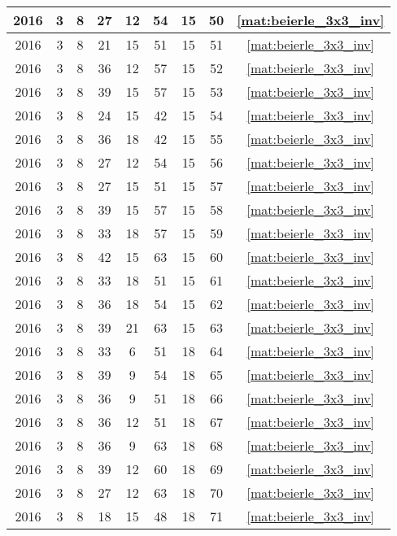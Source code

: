 \begin{longtable}{|c|c|c|c|c|c|c|c|c|}
2016 & 3 & 8 & 27 & 12 & 54 & 15 & 50 & \eqref{mat:beierle_3x3_inv} \\ \hline 
2016 & 3 & 8 & 21 & 15 & 51 & 15 & 51 & \eqref{mat:beierle_3x3_inv} \\ \hline 
2016 & 3 & 8 & 36 & 12 & 57 & 15 & 52 & \eqref{mat:beierle_3x3_inv} \\ \hline 
2016 & 3 & 8 & 39 & 15 & 57 & 15 & 53 & \eqref{mat:beierle_3x3_inv} \\ \hline 
2016 & 3 & 8 & 24 & 15 & 42 & 15 & 54 & \eqref{mat:beierle_3x3_inv} \\ \hline 
2016 & 3 & 8 & 36 & 18 & 42 & 15 & 55 & \eqref{mat:beierle_3x3_inv} \\ \hline 
2016 & 3 & 8 & 27 & 12 & 54 & 15 & 56 & \eqref{mat:beierle_3x3_inv} \\ \hline 
2016 & 3 & 8 & 27 & 15 & 51 & 15 & 57 & \eqref{mat:beierle_3x3_inv} \\ \hline 
2016 & 3 & 8 & 39 & 15 & 57 & 15 & 58 & \eqref{mat:beierle_3x3_inv} \\ \hline 
2016 & 3 & 8 & 33 & 18 & 57 & 15 & 59 & \eqref{mat:beierle_3x3_inv} \\ \hline 
2016 & 3 & 8 & 42 & 15 & 63 & 15 & 60 & \eqref{mat:beierle_3x3_inv} \\ \hline 
2016 & 3 & 8 & 33 & 18 & 51 & 15 & 61 & \eqref{mat:beierle_3x3_inv} \\ \hline 
2016 & 3 & 8 & 36 & 18 & 54 & 15 & 62 & \eqref{mat:beierle_3x3_inv} \\ \hline 
2016 & 3 & 8 & 39 & 21 & 63 & 15 & 63 & \eqref{mat:beierle_3x3_inv} \\ \hline 
2016 & 3 & 8 & 33 & 6 & 51 & 18 & 64 & \eqref{mat:beierle_3x3_inv} \\ \hline 
2016 & 3 & 8 & 39 & 9 & 54 & 18 & 65 & \eqref{mat:beierle_3x3_inv} \\ \hline 
2016 & 3 & 8 & 36 & 9 & 51 & 18 & 66 & \eqref{mat:beierle_3x3_inv} \\ \hline 
2016 & 3 & 8 & 36 & 12 & 51 & 18 & 67 & \eqref{mat:beierle_3x3_inv} \\ \hline 
2016 & 3 & 8 & 36 & 9 & 63 & 18 & 68 & \eqref{mat:beierle_3x3_inv} \\ \hline 
2016 & 3 & 8 & 39 & 12 & 60 & 18 & 69 & \eqref{mat:beierle_3x3_inv} \\ \hline 
2016 & 3 & 8 & 27 & 12 & 63 & 18 & 70 & \eqref{mat:beierle_3x3_inv} \\ \hline 
2016 & 3 & 8 & 18 & 15 & 48 & 18 & 71 & \eqref{mat:beierle_3x3_inv} \\ \hline 

\end{longtable}
